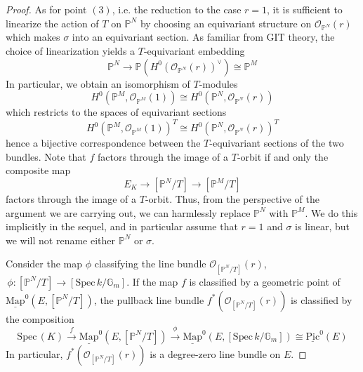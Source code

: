 \documentclass[11pt,letterpaper]{amsart}
\newcommand{\bG}{\mathbb{G}}
\newcommand{\bP}{\mathbb{P}}
\newcommand{\cO}{\mathcal{O}}
\newcommand{\Mapo}[2]{\underline{\mathrm{Map}}^{0}\left (#1,#2\right )}
\newcommand{\Spec}{\mathrm{S}\mathrm{pec}\,}
\newcommand{\Pic}{\underline{\mathrm{Pic}}}
\begin{document}
\begin{proof}
As for point $(3)$, i.e. the reduction to the case $r=1$, it is sufficient 
to linearize the action of $T$ on $\bP^N$ by choosing an equivariant structure on $\cO_{\bP^N}(r)$ which makes $\sigma$ into an equivariant section. As familiar from GIT theory, the choice of linearization yields a $T$-equivariant embedding
$$\bP^N \to \bP(H^0(\cO_{\bP^N}(r))^\vee) \cong \bP^M$$ 
In particular, we obtain an isomorphism of $T$-modules
\begin{equation*}
    H^0(\bP^M,\cO_{\bP^M}(1)) \cong H^0(\bP^N,\cO_{\bP^N}(r))
\end{equation*}
which restricts to  the spaces of equivariant sections
\begin{equation*}
    H^0(\bP^M,\cO_{\bP^M}(1))^{T} \cong H^0(\bP^N,\cO_{\bP^N}(r))^{T}
\end{equation*}
hence a bijective correspondence between the $T$-equivariant sections of the two bundles. Note that $f$ factors through the image of a $T$-orbit if and only the composite map
$$
E_K \to [\bP^N/T] \to [\bP^M/T]
$$ 
factors through the image of a $T$-orbit. Thus, from the perspective of the argument we are carrying out, we can harmlessly replace $\bP^N$ with $\bP^M$.  We do this implicitly in the sequel, and in particular assume that $r=1$ and $\sigma$ is linear, but we will not rename either $\bP^N$ or $\sigma$. 



Consider the map $\phi$  classifying the line bundle $\cO_{[\bP^N/T]}(r)$, $\, 
\phi: [\bP^N/T] \to [\Spec k/\bG_m].$   
If the map $f$ is classified by a geometric point  of $\Mapo{E}{[\bP^N/T]}$, the pullback line bundle $f^*(\cO_{[\bP^N/T]}(r))$ is classified by the composition 
$$
\Spec(K) \stackrel{f}\to \Mapo{E}{[\bP^N/T]} \stackrel{\phi}\to \Mapo{E}{[\Spec k/\bG_m]} \cong \Pic^0(E)
$$
In particular, $f^\ast(\cO_{[\bP^N/T]}(r))$ is a degree-zero line bundle on $E$. 


\end{proof}
\end{document}
